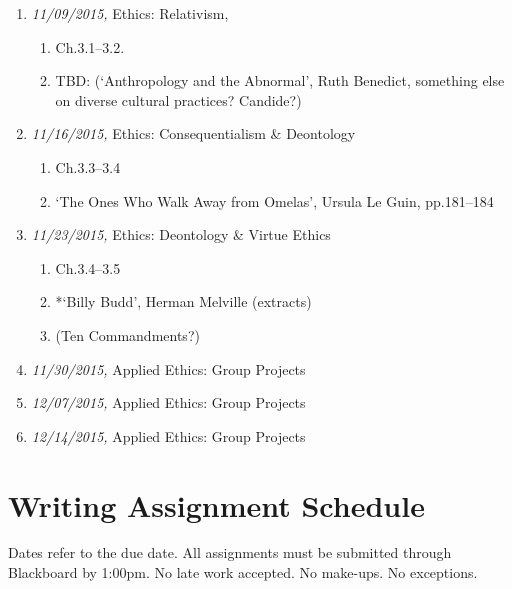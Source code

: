 \documentclass[11pt,article,oneside]{memoir}
\begin{document}
\begin{enumerate}
\item \textit{11/09/2015,} Ethics: Relativism, 
\begin{enumerate}
\item Ch.3.1--3.2.
\item TBD: (`Anthropology and the Abnormal', Ruth Benedict, something else on diverse cultural practices? Candide?)
\end{enumerate}
\item \textit{11/16/2015,} Ethics: Consequentialism \& Deontology 
\begin{enumerate}
\item Ch.3.3--3.4
\item  `The Ones Who Walk Away from Omelas', Ursula Le Guin, pp.181--184 
\end{enumerate}
\item \textit{11/23/2015,} Ethics: Deontology \& Virtue Ethics
\begin{enumerate}
\item Ch.3.4--3.5
\item *`Billy Budd', Herman Melville (extracts)
\item (Ten Commandments?)
\end{enumerate}
\item \textit{11/30/2015,} Applied Ethics: Group Projects
\item \textit{12/07/2015,} Applied Ethics: Group Projects
\item \textit{12/14/2015,} Applied Ethics: Group Projects
\end{enumerate}






\section{Writing Assignment Schedule}
Dates refer to the due date. All assignments must be submitted through Blackboard by 1:00pm. No late work accepted. No make-ups. No exceptions. 
\end{document}
